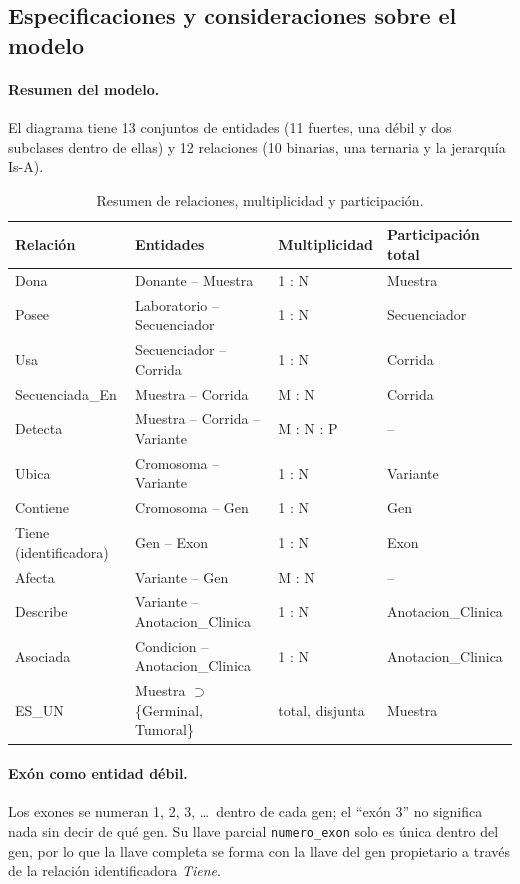 \documentclass[11pt,a4paper]{article}
\newcommand{\tb}[1]{\texttt{#1}}
\begin{document}
\subsection{Especificaciones y consideraciones sobre el modelo}

\paragraph{Resumen del modelo.} El diagrama tiene 13 conjuntos de entidades (11 fuertes, una débil y dos subclases dentro de ellas) y 12 relaciones (10 binarias, una ternaria y la jerarquía Is-A).

\begin{table}[H]
\centering
\small
\begin{tabular}{llll}
\toprule
\textbf{Relación} & \textbf{Entidades} & \textbf{Multiplicidad} & \textbf{Participación total} \\
\midrule
Dona & Donante -- Muestra & 1 : N & Muestra \\
Posee & Laboratorio -- Secuenciador & 1 : N & Secuenciador \\
Usa & Secuenciador -- Corrida & 1 : N & Corrida \\
Secuenciada\_En & Muestra -- Corrida & M : N & Corrida \\
Detecta & Muestra -- Corrida -- Variante & M : N : P & -- \\
Ubica & Cromosoma -- Variante & 1 : N & Variante \\
Contiene & Cromosoma -- Gen & 1 : N & Gen \\
Tiene (identificadora) & Gen -- Exon & 1 : N & Exon \\
Afecta & Variante -- Gen & M : N & -- \\
Describe & Variante -- Anotacion\_Clinica & 1 : N & Anotacion\_Clinica \\
Asociada & Condicion -- Anotacion\_Clinica & 1 : N & Anotacion\_Clinica \\
ES\_UN & Muestra $\supset$ \{Germinal, Tumoral\} & total, disjunta & Muestra \\
\bottomrule
\end{tabular}
\caption{Resumen de relaciones, multiplicidad y participación.}
\end{table}

\paragraph{Exón como entidad débil.} Los exones se numeran 1, 2, 3, \dots\ dentro de cada gen; el ``exón 3'' no significa nada sin decir de qué gen. Su llave parcial \tb{numero\_exon} solo es única dentro del gen, por lo que la llave completa se forma con la llave del gen propietario a través de la relación identificadora \emph{Tiene}.
\end{document}
